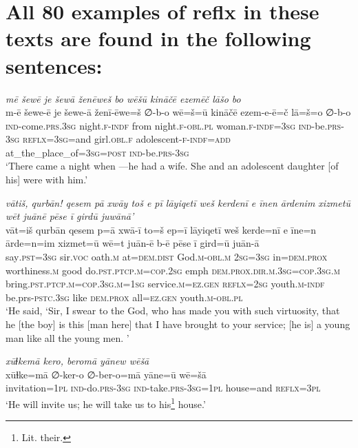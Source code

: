 \chapter{All 80 examples of reflx in these texts are found in the following sentences:}

\ea \label{ZB.8}
\textit{mē šewē je šewā ženēweš bo wēšū kināčē ezemēč lāšo bo} \\ 
\gll m-ē šewe-ē je šewe-ā ženī-ēwe=š ∅-b-o wē=š=ū kināčē ezem-e-ē=č lā=š=o ∅-b-o \\ 
 \textsc{ind-}come\textsc{.prs}\textsc{.3sg} night\textsc{.f}\textsc{-indf} from night\textsc{.f}\textsc{-obl}\textsc{.pl} woman\textsc{.f}\textsc{-indf}\textsc{=3sg} \textsc{ind-}be\textsc{.prs}\textsc{-3sg} \textsc{reflx}\textsc{=3sg}=and girl\textsc{.obl}\textsc{.f} adolescent\textsc{-f}\textsc{-indf}\textsc{=add} at\_the\_place\_of\textsc{=3sg}\textsc{=\textsc{post}} \textsc{ind-}be\textsc{.prs}\textsc{-3sg} \\ 
\glt `There came a night when —he had a wife. She and an adolescent daughter [of his] were with him.'
\z 
 
\ea \label{ZQ.54}
\textit{vātiš, qurbān! qesem pā xwāy toš e pī lāyiqetī weš kerdenī e īnen ārdenim xizmetū wēt juānē pēse ī girdū juwānā’} \\ 
\gll vāt=iš qurbān qesem p=ā xwā-ī to=š ep=ī lāyiqetī weš kerde=nī e īne=n ārde=n=im xizmet=ū wē=t juān-ē b-ē pēse ī gird=ū juān-ā \\ 
 say\textsc{.pst}\textsc{=3sg} sir.\textsc{voc} oath\textsc{.m} at=\textsc{dem.dist} God\textsc{.m}\textsc{-obl}\textsc{.m} \textsc{2sg}\textsc{=3sg} in=\textsc{dem.prox} worthiness\textsc{.m} good do\textsc{.pst}\textsc{.ptcp}\textsc{.m}\textsc{=cop}\textsc{.\textsc{2sg}} emph \textsc{dem.prox}\textsc{.dir}\textsc{.m}\textsc{.3sg}\textsc{=cop}\textsc{.3sg}\textsc{.m} bring\textsc{.pst}\textsc{.ptcp}\textsc{.m}\textsc{=cop}\textsc{.3sg}\textsc{.m}\textsc{=\textsc{1sg}} service\textsc{.m}\textsc{=ez.gen} \textsc{reflx}\textsc{=\textsc{2sg}} youth\textsc{.m}\textsc{-indf} be.prs\textsc{-pstc}\textsc{.3sg} like \textsc{dem.prox} all\textsc{=ez.gen} youth\textsc{.m}\textsc{-obl}\textsc{.pl} \\ 
\glt `He said, ‘Sir, I swear to the God, who has made you with such virtuosity, that he [the boy] is this [man here] that I have brought to your service; [he is] a young man like all the young men. '
\z 
 
\ea \label{HB.35}
\textit{xūɫkemā kero, beromā yānew wēšā} \\ 
\gll xūɫke=mā ∅-ker-o ∅-ber-o=mā yāne=ū wē=šā \\ 
 invitation\textsc{=1pl} \textsc{ind-}do\textsc{.prs}\textsc{-3sg} \textsc{ind-}take\textsc{.prs}\textsc{-3sg}\textsc{=1pl} house=and \textsc{reflx}\textsc{=3pl} \\ 
\glt `He will invite us; he will take us to his\footnote{Lit. their.} house.'
\z 
 
